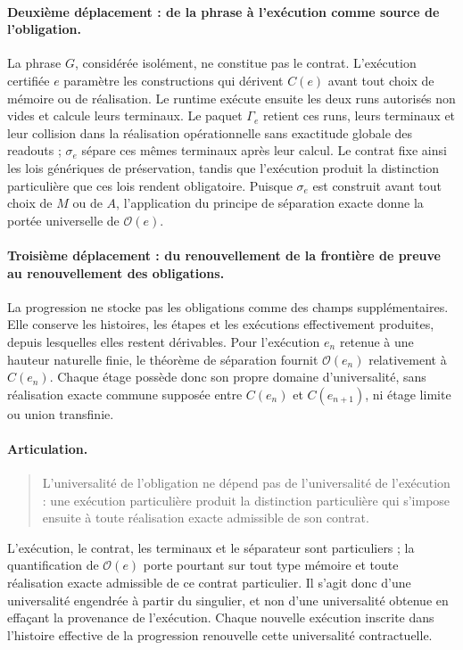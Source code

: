 \documentclass[11pt,a4paper]{article}
\theoremstyle{remark}
\begin{document}
\paragraph{Deuxième déplacement : de la phrase à l'exécution comme source
de l'obligation.}
La phrase $G$, considérée isolément, ne constitue pas le contrat. L'exécution
certifiée $e$ paramètre les constructions qui dérivent $C(e)$ avant tout choix
de mémoire ou de réalisation. Le runtime exécute ensuite les deux runs
autorisés non vides et calcule leurs terminaux. Le paquet $\Gamma_e$ retient
ces runs, leurs terminaux et leur collision dans la réalisation opérationnelle
sans exactitude globale des readouts ; $\sigma_e$ sépare ces mêmes terminaux
après leur calcul.
Le contrat fixe ainsi les lois génériques de préservation, tandis que
l'exécution produit la distinction particulière que ces lois rendent
obligatoire. Puisque $\sigma_e$ est construit avant tout choix de $M$ ou de
$A$, l'application du principe de séparation exacte donne la portée
universelle de $\mathcal O(e)$.

\paragraph{Troisième déplacement : du renouvellement de la frontière de
preuve au renouvellement des obligations.}
La progression ne stocke pas les obligations comme des champs supplémentaires.
Elle conserve les histoires, les étapes et les exécutions effectivement
produites, depuis lesquelles elles restent dérivables. Pour l'exécution $e_n$
retenue à une hauteur naturelle finie, le théorème de séparation fournit
$\mathcal O(e_n)$ relativement à $C(e_n)$. Chaque étage possède donc son
propre domaine d'universalité, sans réalisation exacte commune supposée entre
$C(e_n)$ et $C(e_{n+1})$, ni étage limite ou union transfinie.

\paragraph{Articulation.}
\begin{quote}
L'universalité de l'obligation ne dépend pas de l'universalité de l'exécution :
une exécution particulière produit la distinction particulière qui s'impose
ensuite à toute réalisation exacte admissible de son contrat.
\end{quote}
L'exécution, le contrat, les terminaux et le séparateur sont particuliers ; la
quantification de $\mathcal O(e)$ porte pourtant sur tout type mémoire et toute
réalisation exacte admissible de ce contrat particulier. Il s'agit donc d'une
universalité engendrée à partir du singulier, et non d'une universalité obtenue
en effaçant la provenance de l'exécution. Chaque nouvelle exécution inscrite
dans l'histoire effective de la progression renouvelle cette universalité
contractuelle.
\end{document}
